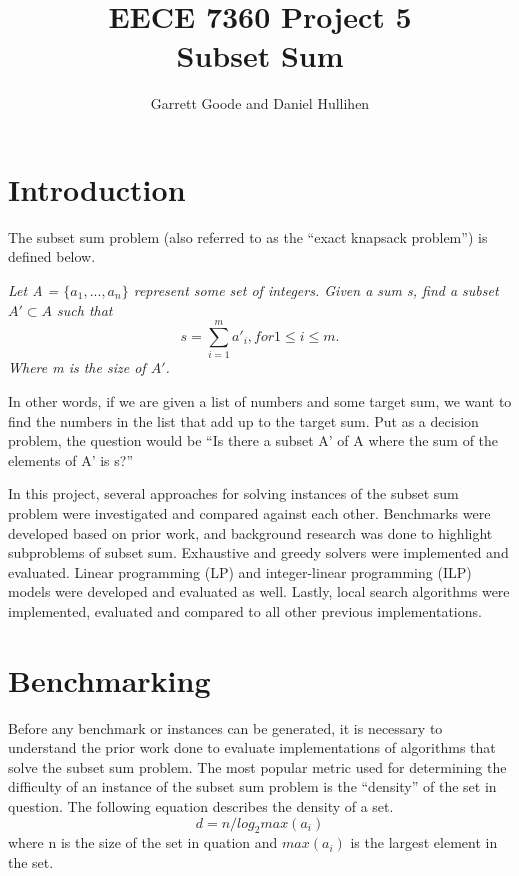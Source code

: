 \documentclass{report}
\begin{document}
\title{EECE 7360 Project 5 \\
  Subset Sum}
\author{Garrett Goode and Daniel Hullihen}
\maketitle


\chapter{Introduction}
The subset sum problem (also referred to as the ``exact knapsack problem'')
is defined below.

\textit{Let A = $\{a_1, ..., a_n\}$ represent some set of integers. Given a sum s, find a subset $A' \subset A$ such that
  $$s = \sum_{i=1}^m a'_i, for 1 \le i \le m.$$
  Where m is the size of $A'$.}
  
In other words, if we are given a list of numbers and some target sum, we want
to find the numbers in the list that add up to the target sum. Put as a decision
problem, the question would be ``Is there a subset A' of A where the sum of the
elements of A' is s?''

In this project, several approaches for solving instances of the subset
sum problem were investigated and compared against each other.
Benchmarks were developed based on prior work,
and background research was done to highlight subproblems of subset sum.
Exhaustive and greedy solvers were implemented and evaluated. Linear
programming (LP) and integer-linear programming (ILP) models were developed
and evaluated as well. Lastly, local search algorithms were implemented,
evaluated and compared to all other previous implementations.

\chapter{Benchmarking}
Before any benchmark or instances can be generated, it is necessary to understand
the prior work done to evaluate implementations of algorithms that solve the
subset sum problem. The most popular metric used for determining the difficulty of
an instance of the subset sum problem is the ``density'' of the set in question.
The following equation
describes the density of a set.
$$d = n / log_2 max(a_i)$$
where n is the size of the set in quation and $max(a_i)$ is the largest element in the set.
\end{document}
